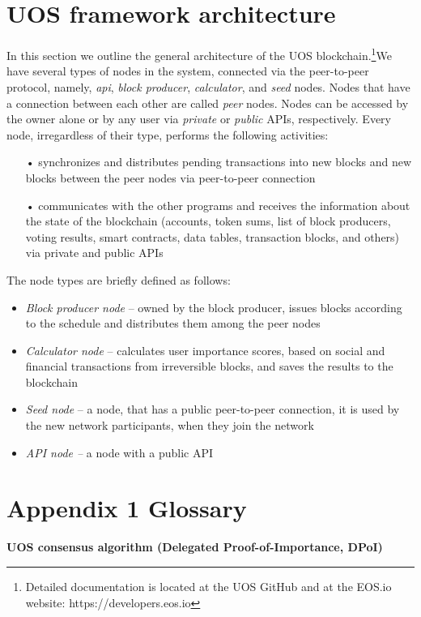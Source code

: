\documentclass[a4paper,12pt]{article}
\begin{document}
\section{U{\degree}OS framework architecture}
In this section we outline the general architecture of the U{\degree}OS blockchain.\footnote{Detailed documentation is located at the U{\degree}OS GitHub and at the EOS.io website: https://developers.eos.io}We have several types of nodes in the system, connected via the peer-to-peer protocol, namely, \emph{api}, \emph{block producer}, \emph{calculator}, and \emph{seed} nodes. Nodes that have a connection between each other are called \emph{peer} nodes. Nodes can be accessed by the owner alone or by any user via \emph{private} or \emph{public} APIs, respectively. Every node, irregardless of their type, performs the following activities:
\begin{itemize}
\item[•] synchronizes and distributes pending transactions into new blocks and new blocks between the peer nodes via peer-to-peer connection
\item[•] communicates with the other programs and receives the information about the state of the blockchain (accounts, token sums, list of block producers, voting results, smart contracts, data tables, transaction blocks, and others) via private and public APIs
\end{itemize}

The node types are briefly defined as follows:
\begin{itemize}
\item \emph{Block producer node} -- owned by the block producer, issues blocks according to the schedule and distributes them among the peer nodes
\item \emph{Calculator node} -- calculates user importance scores, based on social and financial transactions from irreversible blocks, and saves the results to the blockchain
\item \emph{Seed node} -- a node, that has a public peer-to-peer connection, it is used by the new network participants, when they join the network
\item \emph{API node --} a node with a public API
\end{itemize}



\section*{Appendix 1 Glossary}
\textbf{U{\degree}OS consensus algorithm (Delegated Proof-of-Importance, DPoI)}
\end{document}
